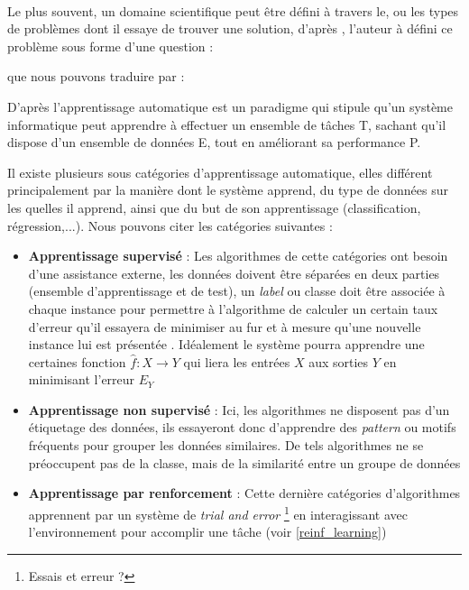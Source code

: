 		\paragraph{}
		Le plus souvent, un domaine scientifique peut être défini à travers le, ou les types de problèmes dont il essaye de trouver une solution, d'après \cite{mitchelllearning}, l'auteur à défini ce problème sous forme d'une question :
		\begin{quote}
			\cite{mitchelllearning}
		\end{quote}
		que nous pouvons traduire par :
		\begin{quote}
		\end{quote}
		\par 
		D'après \cite{mitchelllearning} l'apprentissage automatique est un paradigme qui stipule qu'un système informatique peut apprendre à effectuer un ensemble de tâches T, sachant qu'il dispose d'un ensemble de données E, tout en améliorant sa performance P.
		\par
		Il existe plusieurs sous catégories d'apprentissage automatique, elles différent principalement par la manière dont le système apprend, du type de données sur les quelles il apprend, ainsi que du but de son apprentissage (classification, régression,...). Nous pouvons citer les catégories suivantes :
		\begin{itemize}
			\item  \textbf{Apprentissage supervisé} : Les algorithmes de cette catégories ont besoin d'une assistance externe, les données doivent être séparées en deux parties (ensemble d'apprentissage et de test), un \textit{label} ou classe doit être associée à chaque instance pour permettre à l'algorithme de calculer un certain taux d'erreur qu'il essayera de minimiser au fur et à mesure qu'une nouvelle instance lui est présentée \cite{supervised_learning}. Idéalement le système pourra apprendre une certaines fonction $\hat{f} : X \rightarrow Y$ qui liera les entrées $X$ aux sorties $Y$ en minimisant l'erreur $E_Y$ 
			
			\item \textbf{Apprentissage non supervisé} : Ici, les algorithmes ne disposent pas d'un étiquetage des données, ils essayeront donc d'apprendre des \textit{pattern} ou motifs fréquents pour grouper les données similaires. De tels algorithmes ne se préoccupent pas de la classe, mais de la similarité entre un groupe de données \cite{unsupervised_learning}
			
			\item \textbf{Apprentissage par renforcement} : Cette dernière catégories d'algorithmes apprennent par un système de \textit{trial and error} \footnote{Essais et erreur ?} en interagissant avec l'environnement pour accomplir une tâche (voir \ref{reinf_learning})
		\end{itemize}
